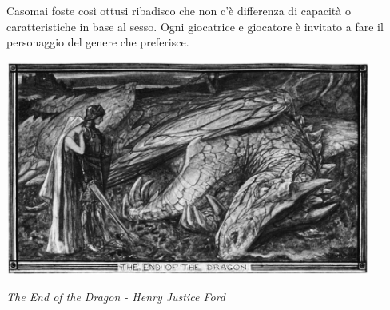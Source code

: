 \begin{changemargin}{0.3cm}{0.3cm}\begin{tcolorbox}[title = Nota sul Sesso dei personaggi]
Casomai foste così ottusi ribadisco che non c'è differenza di capacità o caratteristiche in base al sesso. Ogni giocatrice e giocatore è invitato a fare il personaggio del genere che preferisce.
\end{tcolorbox}\end{changemargin}

\vfill

\begin{center}
\includegraphics[keepaspectratio,width=0.9\textwidth]{immagini/Dragon_by_Henry_Justice_Ford_grey.png}

\emph{The End of the Dragon - Henry Justice Ford}
\end{center}

\pagebreak

